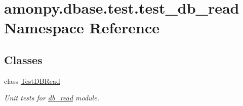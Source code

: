 \hypertarget{namespaceamonpy_1_1dbase_1_1test_1_1test__db__read}{\section{amonpy.\-dbase.\-test.\-test\-\_\-db\-\_\-read Namespace Reference}
\label{namespaceamonpy_1_1dbase_1_1test_1_1test__db__read}
}
\subsection*{Classes}
\begin{DoxyCompactItemize}
\item 
class \hyperlink{classamonpy_1_1dbase_1_1test_1_1test__db__read_1_1_test_d_b_read}{Test\-D\-B\-Read}
\begin{DoxyCompactList}\small\item\em Unit tests for \hyperlink{namespaceamonpy_1_1dbase_1_1db__read}{db\-\_\-read} module. \end{DoxyCompactList}\end{DoxyCompactItemize}
